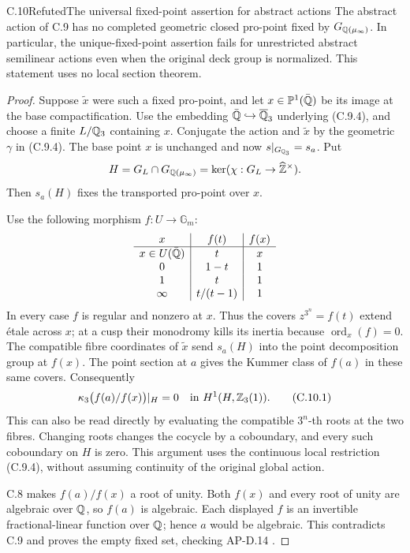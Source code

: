 \begin{statement}{C.10}{Refuted}{The universal fixed-point assertion for abstract actions}
The abstract action of C.9 has no completed geometric closed
pro-point fixed by $G_{\mathbb Q(\mu_\infty)}$. In particular, the
unique-fixed-point assertion fails for unrestricted abstract
semilinear actions even when the original deck group is normalized.
This statement uses no local section theorem.
\end{statement}
\begin{proof}
Suppose $\widetilde x$ were such a fixed pro-point, and let
$x\in\mathbb P^1(\bar{\mathbb Q})$ be its image at the base compactification.
Use the embedding $\bar{\mathbb Q}\hookrightarrow\overline{\mathbb Q}_3$
underlying (C.9.4), and choose a finite $L/\mathbb Q_3$ containing $x$.
Conjugate the action and $\widetilde x$ by the geometric
$\gamma$ in (C.9.4). The base point $x$ is unchanged and now
$s|_{G_{\mathbb Q_3}}=s_a$. Put
\[
 H=G_L\cap G_{\mathbb Q(\mu_\infty)}
   =\ker(\chi:G_L\to\widehat{\mathbb Z}^{\times}).
\]
Then $s_a(H)$ fixes the transported pro-point over $x$.

Use the following morphism $f:U\to\mathbb G_m$:
\[
 \begin{array}{c|c|c}
 x&f(t)&f(x)\\\hline
 x\in U(\bar{\mathbb Q})&t&x\\
 0&1-t&1\\
 1&t&1\\
 \infty&t/(t-1)&1
 \end{array}
\]
In every case $f$ is regular and nonzero at $x$. Thus the covers
$z^{3^n}=f(t)$ extend \'etale across $x$; at a cusp their
monodromy kills its inertia because $\operatorname{ord}_x(f)=0$.
The compatible fibre coordinates of $\widetilde x$ send
$s_a(H)$ into the point decomposition group at $f(x)$.
The point section at $a$ gives the Kummer class of $f(a)$ in
these same covers. Consequently
\[
 \kappa_3\bigl(f(a)/f(x)\bigr)|_H=0
                 \quad\hbox{in }H^1(H,\mathbb Z_3(1)).
 \tag{C.10.1}
\]
This can also be read directly by evaluating the compatible
$3^n$-th roots at the two fibres. Changing roots changes the
cocycle by a coboundary, and every such coboundary on $H$ is zero.
This argument uses the continuous local restriction (C.9.4),
without assuming continuity of the original global action.

C.8 makes $f(a)/f(x)$ a root of unity. Both $f(x)$ and every
root of unity are algebraic over $\mathbb Q$, so $f(a)$ is algebraic.
Each displayed $f$ is an invertible fractional-linear function
over $\mathbb Q$; hence $a$ would be algebraic. This contradicts C.9
and proves the empty fixed set, checking AP-D.14
\cite[D.13--D.14]{AgentAP}.
\end{proof}

